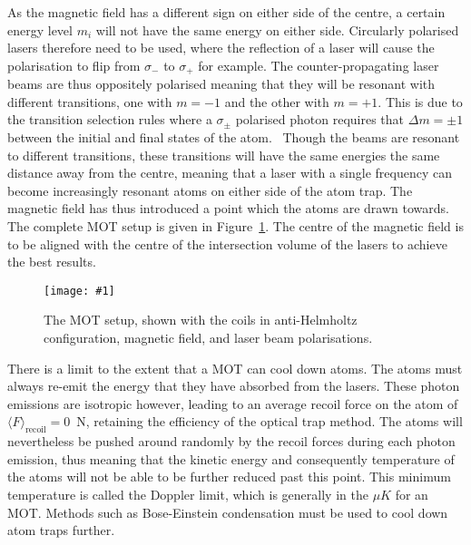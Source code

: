 \documentclass[twocolumn]{article}
\newcommand{\insertFigure}[1]{%
   \texttt{[image: \#1]}%
}
\begin{document}
As the magnetic field has a different sign on either side of the centre, a certain energy level $m_i$ will not have the same energy on either side. Circularly polarised lasers therefore need to be used, where the reflection of a laser will cause the polarisation to flip from $\sigma_-$ to $\sigma_+$ for example. The counter-propagating laser beams are thus oppositely polarised meaning that they will be resonant with different transitions, one with $m=-1$ and the other with $m=+1$. This is due to the transition selection rules where a $\sigma_\pm$ polarised photon requires that $\Delta m=\pm1$ between the initial and final states of the atom.~\cite{Foot} Though the beams are resonant to different transitions, these transitions will have the same energies the same distance away from the centre, meaning that a laser with a single frequency can become increasingly resonant atoms on either side of the atom trap. The magnetic field has thus introduced a point which the atoms are drawn towards. The complete MOT setup is given in Figure~\ref{fig:MOT2}. The centre of the magnetic field is to be aligned with the centre of the intersection volume of the lasers to achieve the best results. \\
\begin{figure} [!h]
	\centering
	\insertFigure{Images/MOT2.png}
	\caption{The MOT setup, shown with the coils in anti-Helmholtz configuration, magnetic field, and laser beam polarisations.~\cite{Foot}}
	\label{fig:MOT2}
\end{figure}
 
\par There is a limit to the extent that a MOT can cool down atoms. The atoms must always re-emit the energy that they have absorbed from the lasers. These photon emissions are isotropic however, leading to an average recoil force on the atom of $\langle F\rangle_{\text{recoil}}=0$~N, retaining the efficiency of the optical trap method. The atoms will nevertheless be pushed around randomly by the recoil forces during each photon emission, thus meaning that the kinetic energy and consequently temperature of the atoms will not be able to be further reduced past this point. This minimum temperature is called the Doppler limit, which is generally in the $\mu K$ for an MOT. Methods such as Bose-Einstein condensation must be used to cool down atom traps further.
\end{document}
